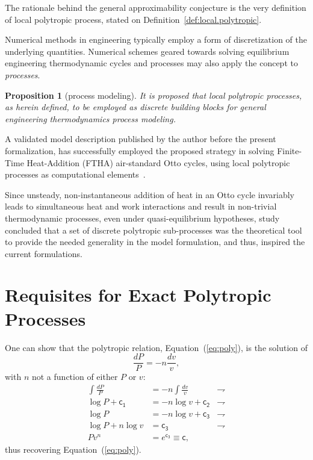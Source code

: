 \documentclass[fleqn,11pt]{SelfArx}
\newtheorem{proposition}{Proposition}
\begin{document}
    The rationale behind the general approximability conjecture is the very definition of  local
    polytropic process, stated on Definition~\ref{def:local.polytropic}.

    Numerical methods in engineering typically employ a form of discretization of the underlying
    quantities. Numerical schemes geared towards solving equilibrium  engineering  thermodynamic
    cycles and processes may also apply the concept to \emph{processes}.

    \begin{proposition}[process modeling]\label{prop:proc.model}
        It is proposed that local polytropic processes, as herein defined,  to  be  employed  as
        discrete building blocks for general engineering thermodynamics process modeling.
    \end{proposition}

    A validated model description published by the author before the present formalization,  has
    successfully employed the proposed strategy  in  solving  Finite-Time  Heat-Addition  (FTHA)
    air-standard   Otto   cycles,   using   local   polytropic   processes   as    computational
    elements~\cite{2017-NaaktgeborenC-IntJMechEngEduc}.

    Since unsteady, non-instantaneous addition of heat in an  Otto  cycle  invariably  leads  to
    simultaneous heat and work interactions and result in non-trivial  thermodynamic  processes,
    even  under  quasi-equilibrium  hypotheses,  study~\cite{2017-NaaktgeborenC-IntJMechEngEduc}
    concluded that a set of discrete  polytropic  sub-processes  was  the  theoretical  tool  to
    provide the needed generality in the model  formulation,  and  thus,  inspired  the  current
    formulations.

\section{Requisites for Exact Polytropic Processes}

    One can show that the polytropic relation, Equation~(\ref{eq:poly}), is the solution of
    \begin{equation}
        \frac{dP}{P} = -n\frac{dv}{v},
        \label{eq:poly.ODE}
    \end{equation}
    \noindent with $n$ not a function of either $P$ or $v$:
    \begin{align}
        \int\frac{dP}{P} & = -n\int\frac{dv}{v} & \rightharpoondown
        \\
        \log P + \mathsf{c_1} & = -n\log v + \mathsf{c_2} & \rightharpoondown
        \\
        \log P & = -n\log v + \mathsf{c_3} & \rightharpoondown
        \\
        \log P + n\log v & = \mathsf{c_3} & \rightharpoondown
        \\
        Pv^n & = e^{\mathsf{c_3}} \equiv \mathsf{c},
    \end{align}
    \noindent thus recovering Equation~(\ref{eq:poly}).
\end{document}
